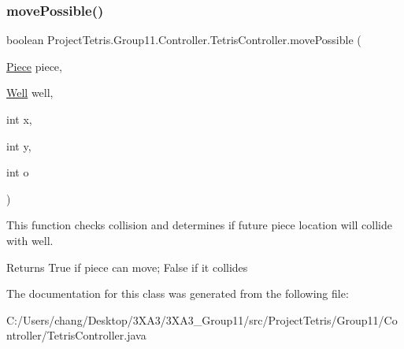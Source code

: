 \subsubsection{\texorpdfstring{move\+Possible()}{movePossible()}}
{\footnotesize\ttfamily boolean Project\+Tetris.\+Group11.\+Controller.\+Tetris\+Controller.\+move\+Possible (\begin{DoxyParamCaption}\item[{\hyperlink{class_project_tetris_1_1_group11_1_1_model_1_1_piece}{Piece}}]{piece,  }\item[{\hyperlink{class_project_tetris_1_1_group11_1_1_model_1_1_well}{Well}}]{well,  }\item[{int}]{x,  }\item[{int}]{y,  }\item[{int}]{o }\end{DoxyParamCaption})}



This function checks collision and determines if future piece location will collide with well. 

\begin{DoxyReturn}{Returns}
True if piece can move; False if it collides 
\end{DoxyReturn}


The documentation for this class was generated from the following file\+:\begin{DoxyCompactItemize}
\item 
C\+:/\+Users/chang/\+Desktop/3\+X\+A3/3\+X\+A3\+\_\+\+Group11/src/\+Project\+Tetris/\+Group11/\+Controller/Tetris\+Controller.\+java\end{DoxyCompactItemize}
